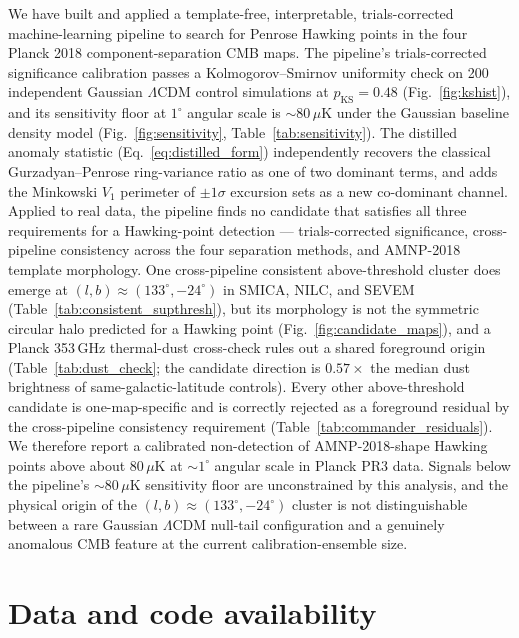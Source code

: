\documentclass[preprint,12pt,nonatbib]{elsarticle}
\begin{document}
We have built and applied a template-free, interpretable, trials-corrected machine-learning pipeline to search for Penrose Hawking points in the four Planck 2018 component-separation CMB maps. The pipeline's trials-corrected significance calibration passes a Kolmogorov--Smirnov uniformity check on 200 independent Gaussian $\Lambda$CDM control simulations at $p_{\text{KS}} = 0.48$ (Fig.~\ref{fig:kshist}), and its sensitivity floor at $1^\circ$ angular scale is $\sim 80\,\mu\mathrm{K}$ under the Gaussian baseline density model (Fig.~\ref{fig:sensitivity}, Table~\ref{tab:sensitivity}). The distilled anomaly statistic (Eq.~\ref{eq:distilled_form}) independently recovers the classical Gurzadyan--Penrose ring-variance ratio as one of two dominant terms, and adds the Minkowski $V_1$ perimeter of $\pm 1\sigma$ excursion sets as a new co-dominant channel. Applied to real data, the pipeline finds no candidate that satisfies all three requirements for a Hawking-point detection --- trials-corrected significance, cross-pipeline consistency across the four separation methods, and AMNP-2018 template morphology. One cross-pipeline consistent above-threshold cluster does emerge at $(l, b) \approx (133^\circ, -24^\circ)$ in SMICA, NILC, and SEVEM (Table~\ref{tab:consistent_supthresh}), but its morphology is not the symmetric circular halo predicted for a Hawking point (Fig.~\ref{fig:candidate_maps}), and a Planck 353\,GHz thermal-dust cross-check rules out a shared foreground origin (Table~\ref{tab:dust_check}; the candidate direction is $0.57 \times$ the median dust brightness of same-galactic-latitude controls). Every other above-threshold candidate is one-map-specific and is correctly rejected as a foreground residual by the cross-pipeline consistency requirement (Table~\ref{tab:commander_residuals}). We therefore report a calibrated non-detection of AMNP-2018-shape Hawking points above about $80\,\mu\mathrm{K}$ at $\sim 1^\circ$ angular scale in Planck PR3 data. Signals below the pipeline's $\sim 80\,\mu\mathrm{K}$ sensitivity floor are unconstrained by this analysis, and the physical origin of the $(l, b) \approx (133^\circ, -24^\circ)$ cluster is not distinguishable between a rare Gaussian $\Lambda$CDM null-tail configuration and a genuinely anomalous CMB feature at the current calibration-ensemble size.

\section*{Data and code availability}
\end{document}
